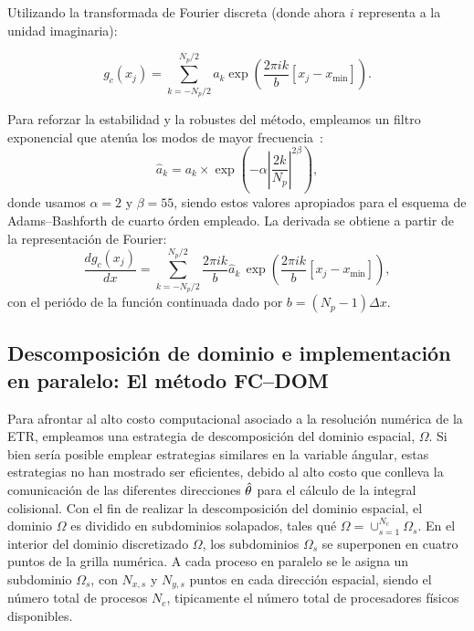 Utilizando la transformada de Fourier discreta (donde ahora $i$ representa a la unidad imaginaria):

\begin{equation}
g_c(x_j)=\sum_{k={-N_p/2}}^{N_p/2}a_k \exp{\left(\frac{2\pi i k}{b} [x_j-x_{\text{min}}]\right)}.
\label{eq:RTEFCSum}
\end{equation}

Para reforzar la estabilidad y la robustes del método, empleamos un filtro exponencial 
que atenúa los modos de mayor frecuencia~\cite{Albin2011}:
\begin{equation}
\hat{a}_k=a_k \times \exp \left(-\alpha \left|\frac{2k}{N_p}\right|^{2\beta}\right) ,
\label{eq:FFilter}
\end{equation}
donde usamos $\alpha=2$ y $\beta=55$, 
siendo estos valores apropiados para el esquema de Adams--Bashforth de cuarto órden empleado.
La derivada se obtiene a partir de la representación de Fourier:
\begin{equation}
\displaystyle \frac{d g_c(x_j)}{dx}=\sum_{k={-N_p/2}}^{N_p/2} \frac{2\pi i k}{b} \hat{a}_k \,  
\exp{\left(\frac{2\pi i k}{b} [x_j-x_{\text{min}}]\right)} ,
\label{eq:RTEFCSumder}
\end{equation}
con el periódo de la función continuada dado por $b=(N_p-1)\Delta x$.

\subsection{Descomposición de dominio e implementación en paralelo: El método FC--DOM}
\label{subsec:FC-DOM}

Para afrontar al alto costo computacional asociado a la resolución numérica de la ETR,
empleamos una estrategia de descomposición del dominio espacial, $\Omega$. 
Si bien sería posible emplear estrategias similares en la variable ángular, 
estas estrategias no han mostrado ser eficientes, debido al alto costo
 que conlleva la comunicación de las diferentes direcciones $\hat{\theta}$ 
 para el cálculo de la integral colisional. 
 Con el fin de realizar la descomposición del dominio espacial, 
 el dominio $\Omega$ es dividido en subdominios solapados, tales qué 
 $\Omega=\cup_{s=1}^{N_{c}}\Omega_s$. 
 En el interior del dominio discretizado $\Omega$, los subdominios $\Omega_s$ se 
 superponen en cuatro puntos de la grilla numérica. 
 A cada proceso en paralelo se le asigna un subdominio $\Omega_s$, 
 con $N_{x,s}$ y $N_{y,s}$ puntos en cada dirección espacial, 
 siendo el número total de procesos $N_c$, tipicamente el número 
 total de procesadores físicos disponibles.
 
